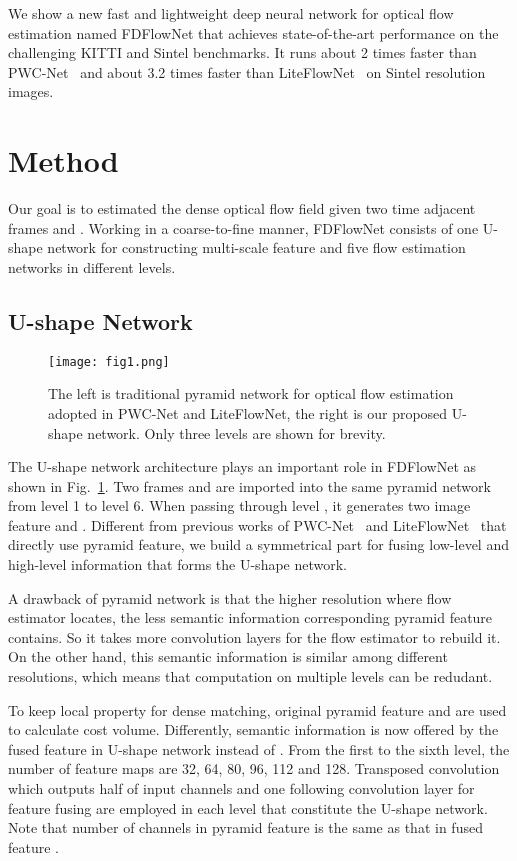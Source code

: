 \documentclass{article}
\begin{document}
 We show a new fast and lightweight deep neural network for optical flow estimation named FDFlowNet that achieves state-of-the-art performance on the challenging KITTI and Sintel benchmarks. It runs about 2 times faster than PWC-Net~\cite{Sun_2018_CVPR} and about 3.2 times faster than LiteFlowNet~\cite{Hui_2018_CVPR} on Sintel resolution images.



\section{Method}
Our goal is to estimated the dense optical flow field  given two time adjacent frames  and . Working in a coarse-to-fine manner, FDFlowNet consists of one U-shape network for constructing multi-scale feature and five flow estimation networks in different levels.

\subsection{U-shape Network}

\begin{figure}[t]
	\centering
	\texttt{[image: fig1.png]}
	\caption{The left is traditional pyramid network for optical flow estimation adopted in PWC-Net and LiteFlowNet, the right is our proposed U-shape network. Only three levels are shown for brevity.}
	\label{fig:1}
\end{figure}

The U-shape network architecture plays an important role in FDFlowNet as shown in Fig.~\ref{fig:1}.
Two frames  and  are imported into the same pyramid network from level 1 to level 6. When passing through level , it generates two image feature  and . Different from previous works of PWC-Net~\cite{Sun_2018_CVPR} and LiteFlowNet~\cite{Hui_2018_CVPR} that directly use pyramid feature, we build a symmetrical part for fusing low-level and high-level information that forms the U-shape network. 

A drawback of pyramid network is that the higher resolution where flow estimator locates, the less semantic information corresponding pyramid feature contains. So it takes more convolution layers for the flow estimator to rebuild it. On the other hand, this semantic information is similar among different resolutions, which means that computation on multiple levels can be redudant. 

To keep local property for dense matching, original pyramid feature  and  are used to calculate cost volume. Differently, semantic information is now offered by the fused feature  in U-shape network instead of . From the first to the sixth level, the number of feature maps are 32, 64, 80, 96, 112 and 128. Transposed convolution which outputs half of input channels and one following convolution layer for feature fusing are employed in each level that constitute the U-shape network. Note that number of channels in pyramid feature  is the same as that in fused feature .
\end{document}
